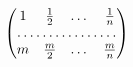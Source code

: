 \[  \begin{pmatrix}
1 & \frac 12 & \dots & \frac 1n \\
\hdotsfor{4} \\
m & \frac m2 & \dots & \frac mn
\end{pmatrix}  \]
